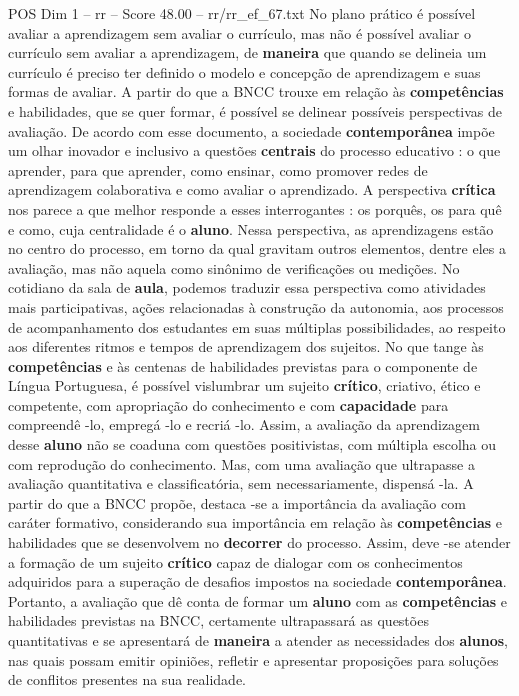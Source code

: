 \begin{textsample}{POS Dim 1 – rr – Score 48.00 – rr/rr\_ef\_67.txt}
No plano prático é possível avaliar a aprendizagem sem avaliar o currículo, mas não é possível avaliar o currículo sem avaliar a aprendizagem, de \textbf{maneira} que quando se delineia um currículo é preciso ter definido o modelo e concepção de aprendizagem e suas formas de avaliar.
A partir do que a BNCC trouxe em relação às \textbf{competências} e habilidades, que se quer formar, é possível se delinear possíveis perspectivas de avaliação.
De acordo com esse documento, a sociedade \textbf{contemporânea} impõe um olhar inovador e inclusivo a questões \textbf{centrais} do processo educativo : o que aprender, para que aprender, como ensinar, como promover redes de aprendizagem colaborativa e como avaliar o aprendizado.
A perspectiva \textbf{crítica} nos parece a que melhor responde a esses interrogantes : os porquês, os para quê e como, cuja centralidade é o \textbf{aluno}.
Nessa perspectiva, as aprendizagens estão no centro do processo, em torno da qual gravitam outros elementos, dentre eles a avaliação, mas não aquela como sinônimo de verificações ou medições.
No cotidiano da sala de \textbf{aula}, podemos traduzir essa perspectiva como atividades mais participativas, ações relacionadas à construção da autonomia, aos processos de acompanhamento dos estudantes em suas múltiplas possibilidades, ao respeito aos diferentes ritmos e tempos de aprendizagem dos sujeitos.
No que tange às \textbf{competências} e às centenas de habilidades previstas para o componente de Língua Portuguesa, é possível vislumbrar um sujeito \textbf{crítico}, criativo, ético e competente, com apropriação do conhecimento e com \textbf{capacidade} para compreendê -lo, empregá -lo e recriá -lo.
Assim, a avaliação da aprendizagem desse \textbf{aluno} não se coaduna com questões positivistas, com múltipla escolha ou com reprodução do conhecimento.
Mas, com uma avaliação que ultrapasse a avaliação quantitativa e classificatória, sem necessariamente, dispensá -la.
A partir do que a BNCC propõe, destaca -se a importância da avaliação com caráter formativo, considerando sua importância em relação às \textbf{competências} e habilidades que se desenvolvem no \textbf{decorrer} do processo.
Assim, deve -se atender a formação de um sujeito \textbf{crítico} capaz de dialogar com os conhecimentos adquiridos para a superação de desafios impostos na sociedade \textbf{contemporânea}.
Portanto, a avaliação que dê conta de formar um \textbf{aluno} com as \textbf{competências} e habilidades previstas na BNCC, certamente ultrapassará as questões quantitativas e se apresentará de \textbf{maneira} a atender as necessidades dos \textbf{alunos}, nas quais possam emitir opiniões, refletir e apresentar proposições para soluções de conflitos presentes na sua realidade.


\end{textsample}
